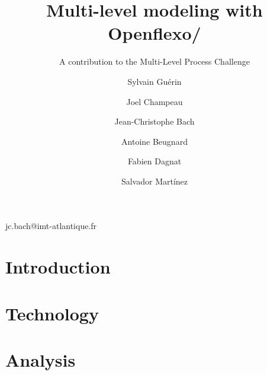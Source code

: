\documentclass[american]{emisa}
\newcommand{\noteJC}[1]{\todo[color=pink!40, author=\textbf{JC}, inline, caption={}]{#1}}
\newcommand{\mpc}{MULTI process challenge\xspace}%
\newcommand{\mlpc}{Multi-Level Process Challenge\xspace}
\begin{document}
\begin{article}{
    \title{Multi-level modeling with Openflexo/\FML}
    \subtitle{A contribution to the \mlpc} %

    \author{Sylvain Guérin}%
    \address{ENSTA Bretagne, Lab-STICC, UMR 6285, Brest, France}

    \author{Joel Champeau}
    \address[a]{}

    \author*{Jean-Christophe Bach}{jc.bach@imt-atlantique.fr}
    \address{IMT Atlantique, Lab-STICC, UMR 6285, Brest, France}

    \author{Antoine Beugnard}
    \address[b]{}

    \author{Fabien Dagnat}
    \address[b]{}

    \author{Salvador Mart\'inez}
    \address[b]{}

    \abstract{}
    
}

\section{Introduction}
\label{sec:introduction}



\section{Technology}
\label{sec:technology}


\section{Analysis}
\label{sec:analysis}



\end{article}
\end{document}
